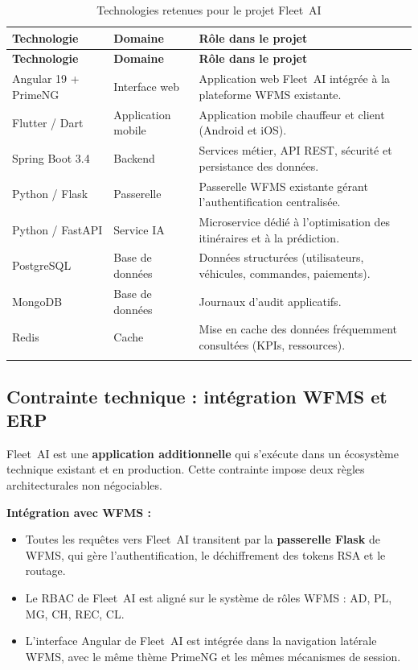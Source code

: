 \setlength{\arrayrulewidth}{1pt}
\begin{longtable}{|>{\raggedright\arraybackslash}p{4cm}|>{\raggedright\arraybackslash}p{3.5cm}|>{\raggedright\arraybackslash}p{7.5cm}|}
\hline
\rowcolor{headerbg}
\textbf{Technologie} & \textbf{Domaine} & \textbf{Rôle dans le projet} \\
\hline
\endfirsthead
\hline
\rowcolor{headerbg}
\textbf{Technologie} & \textbf{Domaine} & \textbf{Rôle dans le projet} \\
\hline
\endhead
\hline
\endfoot

Angular 19 + PrimeNG & Interface web & Application web Fleet~AI intégrée à la plateforme WFMS existante. \\
\hline
Flutter / Dart & Application mobile & Application mobile chauffeur et client (Android et iOS). \\
\hline
Spring Boot 3.4 & Backend & Services métier, API REST, sécurité et persistance des données. \\
\hline
Python / Flask & Passerelle & Passerelle WFMS existante gérant l'authentification centralisée. \\
\hline
Python / FastAPI & Service IA & Microservice dédié à l'optimisation des itinéraires et à la prédiction. \\
\hline
PostgreSQL & Base de données & Données structurées (utilisateurs, véhicules, commandes, paiements). \\
\hline
MongoDB & Base de données & Journaux d'audit applicatifs. \\
\hline
Redis & Cache & Mise en cache des données fréquemment consultées (KPIs, ressources). \\
\hline

\caption{Technologies retenues pour le projet Fleet~AI}
\end{longtable}
\setlength{\arrayrulewidth}{0.4pt}

\subsection{Contrainte technique : intégration WFMS et ERP}

Fleet~AI est une \textbf{application additionnelle} qui s'exécute dans un écosystème technique existant et en production. Cette contrainte impose deux règles architecturales non négociables.

\textbf{Intégration avec WFMS :}
\begin{itemize}[leftmargin=2.5em]
    \item[$\bullet$] Toutes les requêtes vers Fleet~AI transitent par la \textbf{passerelle Flask} de WFMS, qui gère l'authentification, le déchiffrement des tokens RSA et le routage.
    \item[$\bullet$] Le RBAC de Fleet~AI est aligné sur le système de rôles WFMS : AD, PL, MG, CH, REC, CL.
    \item[$\bullet$] L'interface Angular de Fleet~AI est intégrée dans la navigation latérale WFMS, avec le même thème PrimeNG et les mêmes mécanismes de session.
\end{itemize}

